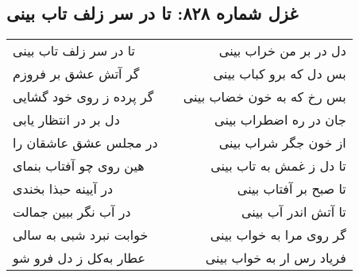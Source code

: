 \begin{center}
\section*{غزل شماره ۸۲۸: تا در سر زلف تاب بینی}
\label{sec:828}
\begin{longtable}{l p{0.5cm} r}
تا در سر زلف تاب بینی
&&
دل در بر من خراب بینی
\\
گر آتش عشق بر فروزم
&&
بس دل که برو کباب بینی
\\
گر پرده ز روی خود گشایی
&&
بس رخ که به خون خضاب بینی
\\
دل بر در انتظار یابی
&&
جان در ره اضطراب بینی
\\
در مجلس عشق عاشقان را
&&
از خون جگر شراب بینی
\\
هین روی چو آفتاب بنمای
&&
تا دل ز غمش به تاب بینی
\\
در آیینه حبذا بخندی
&&
تا صبح بر آفتاب بینی
\\
در آب نگر ببین جمالت
&&
تا آتش اندر آب بینی
\\
خوابت نبرد شبی به سالی
&&
گر روی مرا به خواب بینی
\\
عطار به‌کل ز دل فرو شو
&&
فریاد رس ار به خواب بینی
\\
\end{longtable}
\end{center}
